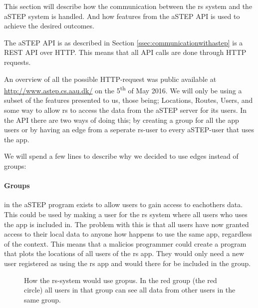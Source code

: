 This section will describe how the communication between the \gls{rs} system and the aSTEP system is handled.
And how features from the aSTEP API is used to achieve the desired outcomes.

The aSTEP API is as described in Section \ref{ssec:communicationwithastep} is a REST API over HTTP. 
This means that all API calls are done through HTTP requests.

An overview of all the possible HTTP-request was public available at \url{http://www.astep.cs.aau.dk/} on the 5\textsuperscript{th} of May 2016.
We will only be using a subset of the features presented to us, those being; Locations, Routes, Users, and some way to allow \gls{rs} to access the data from the aSTEP server for its users.
In the API there are two ways of doing this; by creating a group for all the app users or by having an edge from a seperate \gls{rs}-user to every aSTEP-user that uses the app.

We will spend a few lines to describe why we decided to use edges instead of groups:

\paragraph{Groups} in the aSTEP program exists to allow users to gain access to eachothers data.
This could be used by making a user for the \gls{rs} system where all users who uses the app is included in.
The problem with this is that all users have now granted access to their local data to anyone how happens to use the same app, regardless of the context. 
This means that a malicios programmer could create a program that plots the locations of all users of the \gls{rs} app.
They would only need a new user registered as using the \gls{rs} app and would there for be included in the group.

\begin{figure}[h]
	\centering
	\label{fig:astepgroup}
	\caption{How the \gls{rs}-system would use gropus. In the red group (the red circle) all users in that group can see all data from other users in the same group.}
\end{figure}

